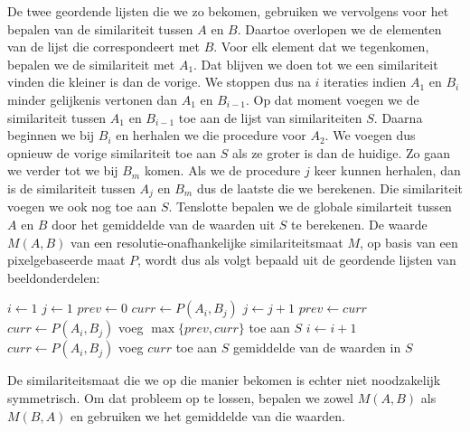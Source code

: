 De twee geordende lijsten die we zo bekomen, gebruiken we vervolgens voor het bepalen van 
de similariteit tussen $A$ en $B$. Daartoe overlopen we de elementen van de 
lijst die correspondeert met $B$. Voor
elk element dat we tegenkomen, bepalen we de similariteit met $A_1$. Dat blijven we doen
tot we een similariteit vinden die kleiner is dan de vorige. We stoppen dus na $i$ iteraties 
indien $A_1$ en $B_i$ minder gelijkenis vertonen dan $A_1$ en $B_{i-1}$. Op dat moment voegen
we de similariteit tussen $A_1$ en $B_{i-1}$ toe aan de lijst van similariteiten $S$. Daarna
beginnen we bij $B_i$ en herhalen we die procedure voor $A_2$. We voegen dus opnieuw de vorige
similariteit toe aan $S$ als ze groter is dan de huidige. Zo gaan we verder tot we bij
$B_m$ komen. Als we de procedure $j$ keer kunnen herhalen, dan
is de similariteit tussen $A_j$ en $B_m$ dus de laatste die we berekenen. Die similariteit
voegen we ook nog toe aan $S$. Tenslotte bepalen we de globale similarteit tussen $A$ en $B$ 
door het gemiddelde van de waarden uit $S$ te berekenen. De waarde $M(A,B)$ van een 
resolutie-onafhankelijke similariteitsmaat $M$, op basis van een 
pixelgebaseerde maat $P$, wordt dus als volgt bepaald uit de geordende lijsten van
beeldonderdelen:
\begin{multicols}{2}
\begin{algorithmic}[1]
\STATE $i \leftarrow 1$
\STATE $j \leftarrow 1$
\STATE $prev \leftarrow 0$
\STATE $curr \leftarrow P(A_i,B_j)$
\STATE $j \leftarrow j+1$
\STATE $prev \leftarrow curr$
\STATE $curr \leftarrow P(A_i,B_j)$
\ENDWHILE
\STATE voeg $\max \{prev, curr\}$ toe aan $S$
\STATE $i \leftarrow i+1$
\ENDWHILE
{}
\STATE $curr \leftarrow P(A_i,B_j)$
\STATE voeg $curr$ toe aan $S$
\ENDIF
\RETURN gemiddelde van de waarden in $S$
\end{algorithmic}
\end{multicols}
\noindent
De similariteitsmaat die we op die manier bekomen is echter niet noodzakelijk symmetrisch. Om dat 
probleem op te lossen, bepalen we zowel $M(A,B)$ als $M(B,A)$ en gebruiken we het gemiddelde van 
die waarden.

